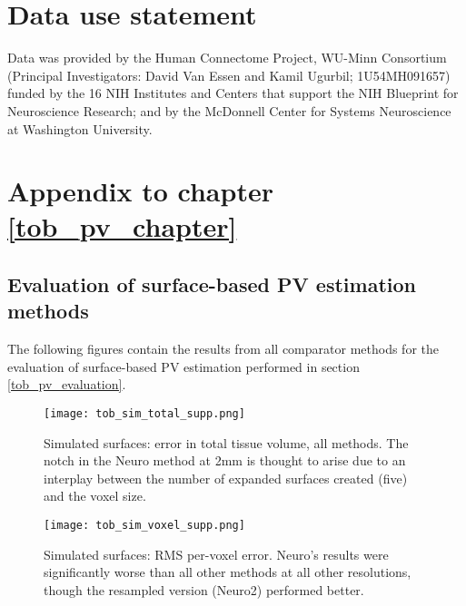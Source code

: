  

\begin{appendices}
\chapter{Data use statement}

Data was provided by the Human Connectome Project, WU-Minn Consortium (Principal Investigators: David Van Essen and Kamil Ugurbil; 1U54MH091657) funded by the 16 NIH Institutes and Centers that support the NIH Blueprint for Neuroscience Research; and by the McDonnell Center for Systems Neuroscience at Washington University.


  \chapter{Appendix to chapter \ref{tob_pv_chapter}}
  \section{Evaluation of surface-based PV estimation methods}
The following figures contain the results from all comparator methods for the evaluation of surface-based PV estimation performed in section \ref{tob_pv_evaluation}. 

\begin{figure}
\centering
\texttt{[image: tob\_sim\_total\_supp.png]}
\caption{Simulated surfaces: error in total tissue volume, all methods. The notch in the Neuro method at 2mm is thought to arise due to an interplay between the number of expanded surfaces created (five) and the voxel size. }
\label{tob_sim_total_supp}
\end{figure}

\begin{figure}
\centering
\texttt{[image: tob\_sim\_voxel\_supp.png]}
\caption{Simulated surfaces: RMS per-voxel error. Neuro’s results were significantly worse than all other methods at all other resolutions, though the resampled version (Neuro2) performed better. }
\label{tob_sim_voxel_supp}
\end{figure}


\end{appendices}
